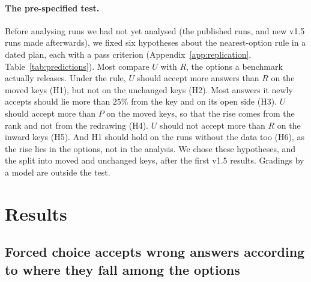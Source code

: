 \documentclass{article}
\begin{document}
\paragraph{The pre-specified test.} Before analysing runs we had not yet analysed (the published runs, and new v1.5
runs made afterwards), we fixed six hypotheses about the nearest-option rule in a dated plan, each with a pass
criterion (Appendix~\ref{app:replication}, Table~\ref{tab:predictions}). Most compare $U$ with $R$, the options a
benchmark actually releases. Under the rule, $U$ should accept more answers than $R$ on the moved keys (H1), but not
on the unchanged keys (H2). Most answers it newly accepts should lie more than $25\%$ from the key and on its open side
(H3). $U$ should accept more than $P$ on the moved keys, so that the rise comes from the rank and not from the
redrawing (H4). $U$ should not accept more than $R$ on the inward keys (H5). And H1 should hold on the runs without
the data too (H6), as the rise lies in the options, not in the analysis. We chose these hypotheses, and the split into
moved and unchanged keys, after the first v1.5 results. Gradings by a model are outside the test.

\section{Results}
\label{sec:results}

\subsection{Forced choice accepts wrong answers according to where they fall among the options}
\label{sec:withdata}
\end{document}
